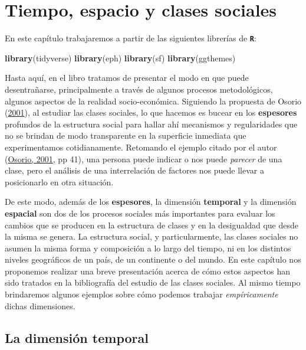 \documentclass[
]{article}
\newenvironment{Shaded}{\begin{snugshade}}{\end{snugshade}}
\newcommand{\FunctionTok}[1]{\textcolor[rgb]{0.13,0.29,0.53}{\textbf{#1}}}
\newcommand{\NormalTok}[1]{#1}
\begin{document}
\hypertarget{tiempo}{%
\section{Tiempo, espacio y clases sociales}\label{tiempo}}

En este capítulo trabajaremos a partir de las siguientes librerías de \textbf{\texttt{R}}:

\begin{Shaded}
\begin{Highlighting}[]
\FunctionTok{library}\NormalTok{(tidyverse)}
\FunctionTok{library}\NormalTok{(eph)}
\FunctionTok{library}\NormalTok{(sf)}
\FunctionTok{library}\NormalTok{(ggthemes)}
\end{Highlighting}
\end{Shaded}

Hasta aquí, en el libro tratamos de presentar el modo en que puede desentrañarse, principalmente a través de algunos procesos metodológicos, algunos aspectos de la realidad socio-económica. Siguiendo la propuesta de Osorio (\protect\hyperlink{ref-Osorio2001}{2001}), al estudiar las clases sociales, lo que hacemos es bucear en los \textbf{espesores} profundos de la estructura social para hallar ahí mecanismos y regularidades que no se brindan de modo transparente en la superficie inmediata que experimentamos cotidianamente. Retomando el ejemplo citado por el autor (\protect\hyperlink{ref-Osorio2001}{Osorio, 2001}, pp 41), una persona puede indicar o nos puede \emph{parecer} de una clase, pero el análisis de una interrelación de factores nos puede llevar a posicionarlo en otra situación.

De este modo, además de los \textbf{espesores}, la dimensión \textbf{temporal} y la dimensión \textbf{espacial} son dos de los procesos sociales más importantes para evaluar los cambios que se producen en la estructura de clases y en la desigualdad que desde la misma se genera. La estructura social, y particularmente, las clases sociales no asumen la misma forma y composición a lo largo del tiempo, ni en los distintos niveles geográficos de un país, de un continente o del mundo. En este capítulo nos proponemos realizar una breve presentación acerca de cómo estos aspectos han sido tratados en la bibliografía del estudio de las clases sociales. Al mismo tiempo brindaremos algunos ejemplos sobre cómo podemos trabajar \emph{empíricamente} dichas dimensiones.

\hypertarget{temporal}{%
\subsection{La dimensión temporal}\label{temporal}}
\end{document}

